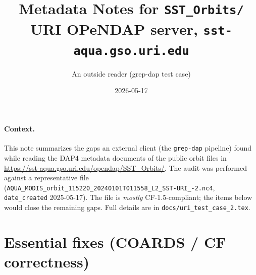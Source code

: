\documentclass[11pt]{article}
\title{Metadata Notes for \texttt{SST\_Orbits/}\\
       \large URI OPeNDAP server, \texttt{sst-aqua.gso.uri.edu}}
\author{An outside reader (grep-dap test case)}
\date{2026-05-17}
\begin{document}
\maketitle

\paragraph{Context.}
This note summarizes the gaps an external client (the
\texttt{grep-dap} pipeline) found while reading the
DAP4 metadata documents of the public orbit files in
\url{https://sst-aqua.gso.uri.edu/opendap/SST_Orbits/}.
The audit was performed against a representative file\linebreak
(\texttt{AQUA\_MODIS\_orbit\_115220\_\allowbreak 20240101T011558\_\allowbreak L2\_SST-URI\_-2.nc4},
\texttt{date\_created} 2025-05-17). The file is \emph{mostly}
CF-1.5-compliant; the items below would close the remaining
gaps. Full details are in \texttt{docs/uri\_test\_case\_2.tex}.

\section*{Essential fixes (COARDS / CF correctness)}
\end{document}
